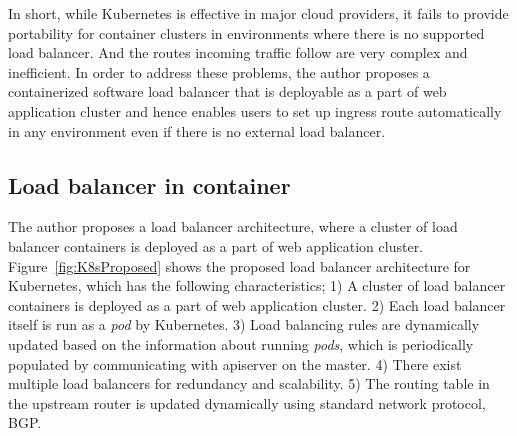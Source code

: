 In short, while Kubernetes is effective in major cloud providers, it fails to provide portability for container clusters in environments where there is no supported load balancer. 
And the routes incoming traffic follow are very complex and inefficient.
In order to address these problems, the author proposes a containerized software load balancer that is deployable as a part of web application cluster and hence enables users to set up ingress route automatically in any environment even if there is no external load balancer.

\FloatBarrier

\subsection{Load balancer in container}\label{Load balancer in container}

The author proposes a load balancer architecture, where a cluster of load balancer containers is deployed as a part of web application cluster.
Figure~\ref{fig:K8sProposed} shows the proposed load balancer architecture for Kubernetes,
which has the following characteristics;
1) A cluster of load balancer containers is deployed as a part of  web application cluster.
2) Each load balancer itself is run as a {\em pod} by Kubernetes.
3) Load balancing rules are dynamically updated based on the information about running {\em pods}, which is periodically populated by communicating with apiserver on the master.
4) There exist multiple load balancers for redundancy and scalability.
5) The routing table in the upstream router is updated dynamically using standard network protocol, BGP.

